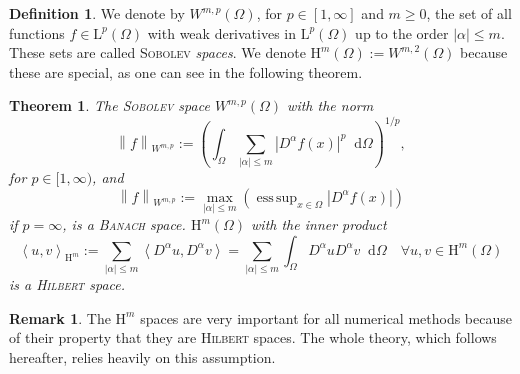 \documentclass[12pt,a4paper,twoside, open=right]{scrreprt}
\theoremstyle{definition}
\newtheorem{rem}[auf]{Remark}
\newtheorem{defn}[auf]{Definition}
\theoremstyle{plain}
\newtheorem{sa}[auf]{Theorem}
\DeclareMathOperator*{\esssup}{ess\,sup} %
\newcommand{\abs}[1]{\left\vert #1\right\vert}
\newcommand{\dotp}[2]{\left\langle #1,#2\right\rangle}
\newcommand{\norm}[1]{\left\lVert#1\right\rVert}
\newcommand{\D}{\mathop{}\!\mathrm{d}}
\begin{document}
\begin{defn}
    We denote by $W^{m,p}(\Omega)$, for $p\in[1,\infty]$ and $m\ge 0$, the set of all functions $f\in \mathrm{L}^p(\Omega)$ with weak derivatives in $\mathrm{L}^p(\Omega)$ up to the order $\abs{\alpha}\le m$. These sets are called \textsc{Sobolev} \emph{spaces}. We denote $\mathrm{H}^m(\Omega):=W^{m,2}(\Omega)$ because these are special, as one can see in the following theorem.
\end{defn}
\begin{sa}
    The \textsc{Sobolev} space $W^{m,p}(\Omega)$ with the norm
    \begin{equation}
        \norm{f}_{W^{m,p}}:=\left(\int_\Omega\sum_{\abs{\alpha}\le m}\abs{D^{\alpha} f(x)}^p\D\Omega\right)^{1/p},
    \end{equation}
    for $p\in[1,\infty)$, and 
    \begin{equation}
        \norm{f}_{W^{m,p}}:=\max_{\abs{\alpha}\le m}\left(\esssup_{x\in\Omega}\abs{D^{\alpha}f(x)}\right)
    \end{equation}
    if $p=\infty$, is a \textsc{Banach} space. $\mathrm{H}^m(\Omega)$ with the inner product
    \begin{equation}
        \dotp{u}{v}_{\mathrm{H}^m}:=\sum_{\abs{\alpha}\le m}\dotp{D^{\alpha}u}{D^{\alpha}v}=\sum_{\abs{\alpha}\le m}\int_\Omega D^\alpha u D^\alpha v\D\Omega \quad \forall u,v\in \mathrm{H}^m(\Omega)
    \end{equation}
    is a \textsc{Hilbert} space.
\end{sa}
\begin{rem}
    The $\mathrm{H}^m$ spaces are very important for all numerical methods because of their property that they are \textsc{Hilbert} spaces. The whole theory, which follows hereafter, relies heavily on this assumption.
\end{rem}
\end{document}
